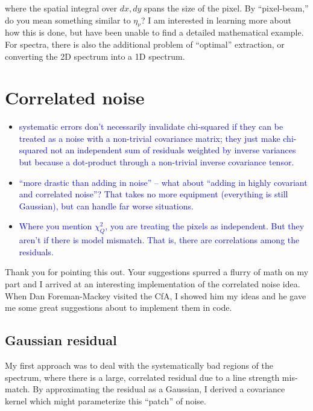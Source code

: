 \documentclass[preprint]{aastex} %
\newcommand{\hcom}[1]{ \textcolor{Blue}{#1}}
\begin{document}
where the spatial integral over $dx, dy$ spans the size of the pixel. By ``pixel-beam,'' do you mean something similar to $\eta_\nu$? I am interested in learning more about how this is done, but have been unable to find a detailed mathematical example. For spectra, there is also the additional problem of ``optimal'' extraction, or converting the 2D spectrum into a 1D spectrum.


\section{Correlated noise}
\begin{itemize}
  \item \hcom{systematic errors don't necessarily invalidate chi-squared if they can be treated as a noise with a non-trivial covariance matrix; they just make chi-squared not an independent sum of residuals weighted by inverse variances but because a dot-product through a non-trivial inverse covariance tensor.}
  \item \hcom{``more drastic than adding in noise'' -- what about ``adding in highly covariant and correlated noise''? That takes no more equipment (everything is still Gaussian), but can handle far worse situations.}
  \item \hcom{Where you mention $\chi^2_Q$, you are treating the pixels as independent. But they aren't if there is model mismatch. That is, there are correlations among the residuals.}
\end{itemize}

Thank you for pointing this out. Your suggestions spurred a flurry of math on my part and I arrived at an interesting implementation of the correlated noise idea. When Dan Foreman-Mackey visited the CfA, I showed him my ideas and he gave me some great suggestions about to implement them in code.  

\subsection{Gaussian residual}
My first approach was to deal with the systematically bad regions of the spectrum, where there is a large, correlated residual due to a line strength mis-match. By approximating the residual as a Gaussian, I derived a covariance kernel which might parameterize this ``patch'' of noise.
\end{document}
